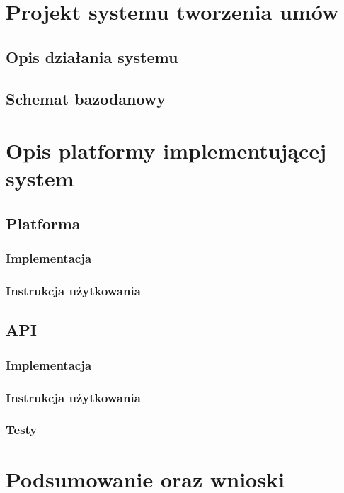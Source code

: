\documentclass[12pt]{report}
\begin{document}
    \chapter{Projekt systemu tworzenia umów}
         \section{Opis działania systemu}
         \section{Schemat bazodanowy}
    \chapter{Opis platformy implementującej system}
        \section{Platforma}
            \subsection{Implementacja}
            \subsection{Instrukcja użytkowania}
        \section{API}
            \subsection{Implementacja}
            \subsection{Instrukcja użytkowania}
            \subsection{Testy}
    \chapter{Podsumowanie oraz wnioski}
    \listoffigures
    
\end{document}
